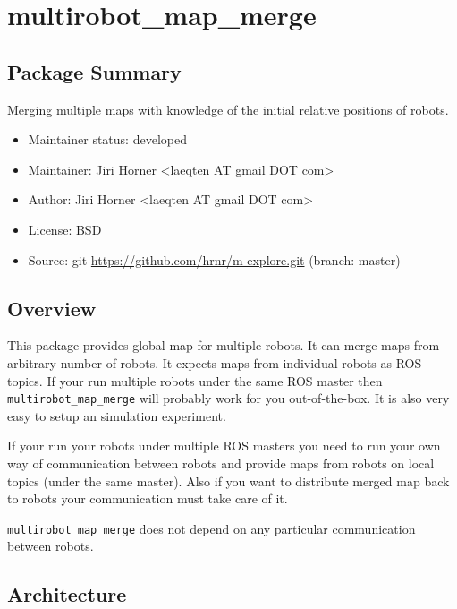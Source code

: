 \chapter{multirobot\_map\_merge}

\section{Package Summary}

Merging multiple maps with knowledge of the initial relative positions of robots.

\begin{itemize}
    \item Maintainer status: developed
    \item Maintainer: Jiri Horner \textless laeqten AT gmail DOT com\textgreater
    \item Author: Jiri Horner \textless laeqten AT gmail DOT com\textgreater
    \item License: BSD
    \item Source: git \url{https://github.com/hrnr/m-explore.git} (branch: master)
\end{itemize}

\section{Overview}

This package provides global map for multiple robots. It can merge maps from arbitrary number of robots. It expects maps from individual robots as ROS topics. If your run multiple robots under the same ROS master then \texttt{multirobot\_map\_merge} will probably work for you out-of-the-box. It is also very easy to setup an simulation experiment.


If your run your robots under multiple ROS masters you need to run your own way of communication between robots and provide maps from robots on local topics (under the same master). Also if you want to distribute merged map back to robots your communication must take care of it.


\texttt{multirobot\_map\_merge} does not depend on any particular communication between robots.

\section{Architecture}

